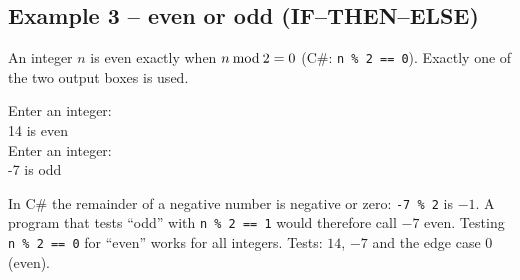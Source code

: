 \documentclass[11pt,a4paper]{article}
\begin{document}
\subsection{Example 3 -- even or odd (IF--THEN--ELSE)}
An integer $n$ is even exactly when $n \mathbin{\mathrm{mod}} 2 = 0$ (C\#: \texttt{n \% 2 == 0}). Exactly one of the two output boxes is used.
\begin{center}
\begin{minipage}[c]{0.42\linewidth}\centering
{}
\end{minipage}\hfill
\begin{minipage}[c]{0.54\linewidth}
\begin{consolebox}
Enter an integer: \\ 14 is even\\
Enter an integer: \\ -7 is odd
\end{consolebox}
\end{minipage}
\end{center}
\begin{warnbox}
In C\# the remainder of a negative number is negative or zero: \texttt{-7 \% 2} is $-1$. A program that tests ``odd'' with \texttt{n \% 2 == 1} would therefore call $-7$ even. Testing \texttt{n \% 2 == 0} for ``even'' works for all integers. Tests: $14$, $-7$ and the edge case $0$ (even).
\end{warnbox}
\end{document}
